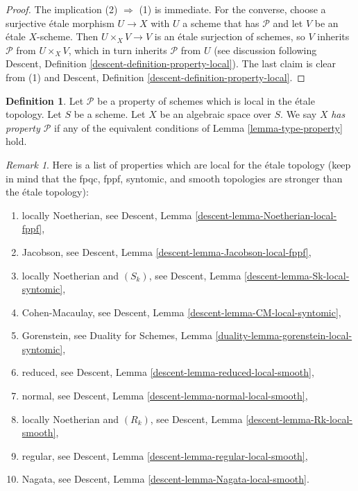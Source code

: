 \documentclass{stacks-project}
\theoremstyle{plain}
\theoremstyle{definition}
\newtheorem{definition}[subsection]{Definition}
\theoremstyle{remark}
\newtheorem{remark}[subsection]{Remark}
\numberwithin{equation}{subsection}
\begin{document}
\begin{proof}
The implication (2) $\Rightarrow$ (1) is immediate.
For the converse, choose a surjective \'etale morphism $U \to X$
with $U$ a scheme that has $\mathcal{P}$ and let $V$ be an \'etale
$X$-scheme. Then $U \times_X V \rightarrow V$ is an \'etale surjection
of schemes, so $V$ inherits $\mathcal{P}$ from $U \times_X V$, which in
turn inherits $\mathcal{P}$ from $U$ (see discussion following
Descent, Definition \ref{descent-definition-property-local}).
The last claim is clear from (1) and
Descent, Definition \ref{descent-definition-property-local}.
\end{proof}

\begin{definition}
\label{definition-type-property}
Let $\mathcal{P}$ be a property of schemes which is
local in the \'etale topology.
Let $S$ be a scheme.
Let $X$ be an algebraic space over $S$.
We say $X$ {\it has property $\mathcal{P}$}
if any of the equivalent conditions of
Lemma \ref{lemma-type-property}
hold.
\end{definition}

\begin{remark}
\label{remark-list-properties-local-etale-topology}
Here is a list of properties which are local for the \'etale topology
(keep in mind that the fpqc, fppf, syntomic, and smooth topologies are
stronger than the \'etale topology):
\begin{enumerate}
\item locally Noetherian, see
Descent, Lemma \ref{descent-lemma-Noetherian-local-fppf},
\item Jacobson, see
Descent, Lemma \ref{descent-lemma-Jacobson-local-fppf},
\item locally Noetherian and $(S_k)$, see
Descent, Lemma \ref{descent-lemma-Sk-local-syntomic},
\item Cohen-Macaulay, see
Descent, Lemma \ref{descent-lemma-CM-local-syntomic},
\item Gorenstein, see
Duality for Schemes, Lemma \ref{duality-lemma-gorenstein-local-syntomic},
\item reduced, see
Descent, Lemma \ref{descent-lemma-reduced-local-smooth},
\item normal, see
Descent, Lemma \ref{descent-lemma-normal-local-smooth},
\item locally Noetherian and $(R_k)$, see
Descent, Lemma \ref{descent-lemma-Rk-local-smooth},
\item regular, see
Descent, Lemma \ref{descent-lemma-regular-local-smooth},
\item Nagata, see
Descent, Lemma \ref{descent-lemma-Nagata-local-smooth}.
\end{enumerate}
\end{remark}
\end{document}
